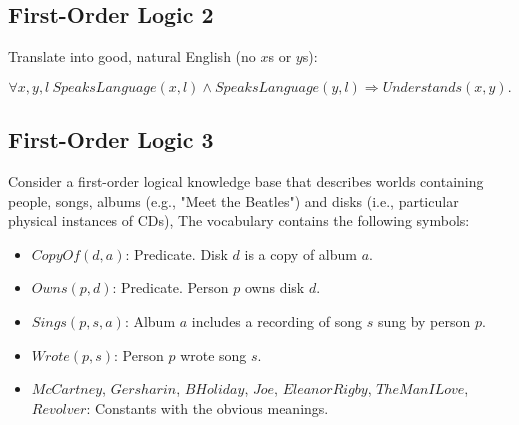 \documentclass[11pt, answers]{exam}
\begin{document}
%
%
\begin{questions}
\section{First-Order Logic 2}
\question

Translate into good, natural English (no $x$s or $y$s):

$$\forall x,y,l\ SpeaksLanguage(x,l)\wedge SpeaksLanguage(y,l)\Rightarrow Understands(x,y).$$

\end{questions}


%
%
\begin{questions}
\section{First-Order Logic 3}
\question

Consider a first-order logical knowledge base that describes worlds containing people, songs, albums (e.g., "Meet the Beatles") and disks (i.e., particular physical instances of CDs), The vocabulary contains the following symbols:
\begin{itemize}
	\item $CopyOf(d,a)$: Predicate. Disk $d$ is a copy of album $a$.
	\item $Owns(p, d)$: Predicate. Person $p$ owns disk $d$.
	\item $Sings(p, s, a)$: Album $a$ includes a recording of song $s$ sung by person $p$. 
	\item $Wrote(p, s)$: Person $p$ wrote song $s$.
	\item $McCartney$, $Gersharin$, $BHoliday$, $Joe$, $EleanorRigby$, $TheManILove$, $Revolver$: Constants with the obvious meanings.
\end{itemize}


\end{questions}
\end{document}

